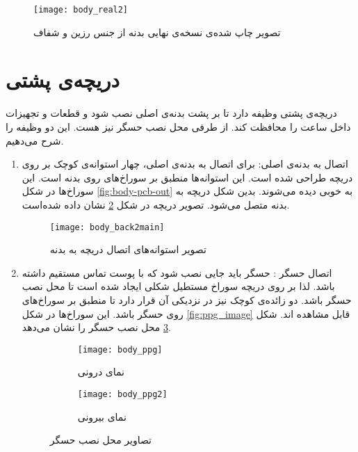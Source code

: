 	\begin{figure}[h]
		\centering
		\texttt{[image: body\_real2]}
		\caption{تصویر چاپ شده‌ی نسخه‌ی نهایی بدنه از جنس رزین و شفاف}
		\label{fig:body-real}
	\end{figure}

\section{دریچه‌ی پشتی}
دریچه‌ی پشتی وظیفه دارد تا بر پشت بدنه‌ی اصلی نصب شود و قطعات و تجهیزات داخل ساعت را محافظت کند. از طرفی محل نصب حسگر  نیز هست. این دو وظیفه را شرح می‌دهیم.

\begin{enumerate}
	\item اتصال به بدنه‌ی اصلی:
	برای اتصال به بدنه‌ی اصلی، چهار استوانه‌ی کوچک بر روی دریچه طراحی شده ‌است. این استوانه‌ها منطبق بر سوراخ‌های روی بدنه است. این سوراخ‌ها در شکل \ref{fig:body-pcb-out} به خوبی دیده می‌شوند. بدین شکل دریچه به بدنه متصل می‌شود. تصویر دریچه در شکل \ref{fig:body-back2main} نشان داده شده‌است.
	
	\begin{figure}[h]
		\centering
		\texttt{[image: body\_back2main]}
		\caption{تصویر استوانه‌های اتصال دریچه به بدنه}
		\label{fig:body-back2main}
	\end{figure}
	
	\item اتصال حسگر :
	حسگر باید جایی نصب شود که با پوست تماس مستقیم داشته باشد. لذا بر روی دریچه سوراخ مستطیل شکلی ایجاد شده است تا محل نصب حسگر باشد. دو زائده‌ی کوچک نیز در نزدیکی آن قرار دارد تا منطبق بر سوراخ‌های روی حسگر باشد. این سوراخ‌ها در شکل \ref{fig:ppg_image} قابل مشاهده ‌اند. شکل \ref{fig:body-ppg} محل نصب حسگر را نشان می‌دهد.
	
	\begin{figure}[h]
		\centering
		\begin{subfigure}{0.35\textwidth}
			\centering
			\texttt{[image: body\_ppg]}
			\caption{نمای درونی}
		\end{subfigure} 
		\begin{subfigure}{0.45\textwidth}
			\centering
			\texttt{[image: body\_ppg2]}
			\caption{نمای بیرونی}
		\end{subfigure}
		\caption{تصاویر محل نصب حسگر }
		\label{fig:body-ppg}
	\end{figure}

\end{enumerate}

